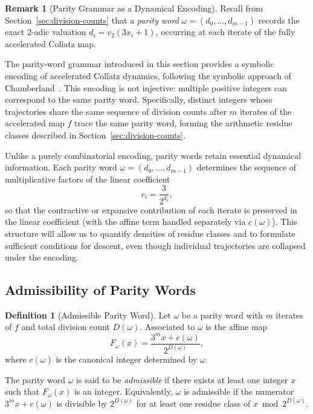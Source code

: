\documentclass[12pt, oneside]{article}   	%
\numberwithin{equation}{section}          %
\theoremstyle{definition}
\newtheorem{define}{Definition}[section]
\newtheorem*{remark}{Remark}
\begin{document}
\begin{remark}[Parity Grammar as a Dynamical Encoding]
Recall from Section~\ref{sec:division-counts} that a \emph{parity word}
$\omega=(d_0,\dots,d_{m-1})$ records the exact 2-adic valuation
$d_i = v_2(3 x_i + 1)$, occurring at each iterate of the fully accelerated
Collatz map.

The parity-word grammar introduced in this section provides a symbolic
encoding of accelerated Collatz dynamics, following the symbolic approach
of Chamberland~\cite{Chamberland2003}. This encoding is not injective:
multiple positive integers can correspond to the same parity word.
Specifically, distinct integers whose trajectories share the same sequence
of division counts after $m$ iterates of the accelerated map $f$ trace the
same parity word, forming the arithmetic residue classes described in
Section~\ref{sec:division-counts}.

Unlike a purely combinatorial encoding, parity words retain essential
dynamical information. Each parity word $\omega=(d_0,\dots,d_{m-1})$
determines the sequence of multiplicative factors of the linear coefficient
\[
r_i = \frac{3}{2^{d_i}},
\]
so that the contractive or expansive contribution of each iterate is
preserved in the linear coefficient (with the affine term handled separately
via $c(\omega)$). This structure will allow us to quantify densities of
residue classes and to formulate sufficient conditions for descent, even
though individual trajectories are collapsed under the encoding.
\end{remark}

\subsection{Admissibility of Parity Words}

\begin{define}[Admissible Parity Word]
\label{def:admissible-parity-word}
Let \(\omega\) be a parity word with $m$ iterates of $f$ and total division count
$D(\omega)$. Associated to $\omega$ is the affine map
\[
F_\omega(x) = \frac{3^m x + c(\omega)}{2^{D(\omega)}},
\]
where $c(\omega)$ is the canonical integer determined by $\omega$.

The parity word $\omega$ is said to be \emph{admissible} if there exists at
least one integer $x$ such that $F_\omega(x)$ is an integer. Equivalently,
$\omega$ is admissible if the numerator $3^m x + c(\omega)$ is divisible by
$2^{D(\omega)}$ for at least one residue class of $x \bmod 2^{D(\omega)}$.
\end{define}
\end{document}
